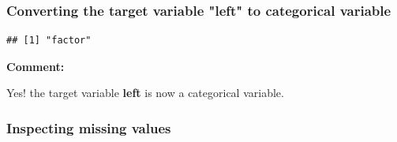 \documentclass[
  11pt,
]{article}
\newenvironment{Shaded}{\begin{snugshade}}{\end{snugshade}}
\newcommand{\AttributeTok}[1]{\textcolor[rgb]{0.13,0.29,0.53}{#1}}
\newcommand{\DecValTok}[1]{\textcolor[rgb]{0.00,0.00,0.81}{#1}}
\newcommand{\FunctionTok}[1]{\textcolor[rgb]{0.13,0.29,0.53}{\textbf{#1}}}
\newcommand{\NormalTok}[1]{#1}
\newcommand{\OtherTok}[1]{\textcolor[rgb]{0.56,0.35,0.01}{#1}}
\newcommand{\SpecialCharTok}[1]{\textcolor[rgb]{0.81,0.36,0.00}{\textbf{#1}}}
\newcommand{\StringTok}[1]{\textcolor[rgb]{0.31,0.60,0.02}{#1}}
\begin{document}
\subsubsection{Converting the target variable "left" to categorical variable}

\begin{Shaded}
\end{Shaded}

\begin{verbatim}
## [1] "factor"
\end{verbatim}

\textbf{Comment:}

Yes! the target variable \textbf{left} is now a categorical variable.

\subsubsection{Inspecting missing values}
\end{document}
